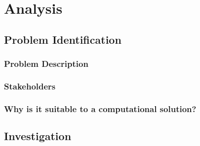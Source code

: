\documentclass[11pt,a4paper]{article}
\title{\projectname}
\author{James Cahill}
\date{Sepetember 2023}
\begin{document}



\tableofcontents

\pagebreak

\section{Analysis}

\subsection{Problem Identification}

\subsubsection{Problem Description}


\subsubsection{Stakeholders}


\subsubsection{Why is it suitable to a computational solution?}

\begin{comment}
why creating this solution is better with the use of technology
eg:
need a way to store large amounts of data; perfect for a database
easy way to add/remove inventory (would be labour intensive otherwise - paper based systems)
can be v. easily done with a gui

identifying key things the solution should have; explain why doing
this computationally is a good idea / is easy

1/2 a page to a page

eg decomposition/abstraction
decomp:
large program; by splitting into smaller sub-programs
can make each one individually and combine at the end
explain how they can be used to achieve the goals/impls
\end{comment}

\subsection{Investigation}
\end{document}
